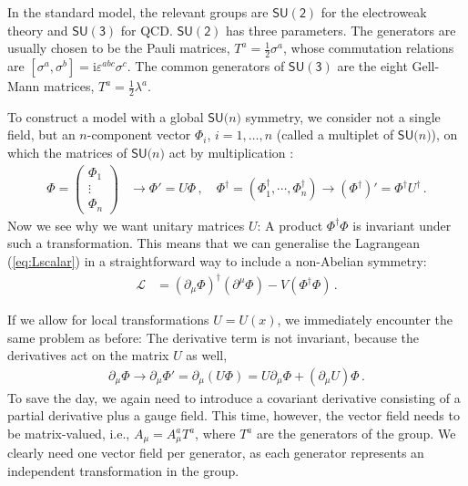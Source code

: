 \documentclass[12pt]{report}
\renewcommand{\L}{\ensuremath{\mathscr{L}}}
\newcommand{\sun}{\ensuremath{\mathsf{SU(}n\mathsf{)}}}
\newcommand{\sutwo}{\ensuremath{\mathsf{SU(2)}}}
\newcommand{\suthree}{\ensuremath{\mathsf{SU(3)}}}
\renewcommand{\i}{\ensuremath{\text{i}}}
\newcommand{\2}{\ensuremath{\sqrt{2}\,}}
\renewcommand{\L}{\ensuremath{\mathscr{L}}}
\begin{document}
{      In the standard model, the relevant groups are $\sutwo$ for the electroweak theory and
      $\suthree$ for QCD. $\sutwo$ has three parameters. The generators are usually
      chosen to be the Pauli matrices,
      $T^a=\frac{1}{2}\sigma^a$, whose commutation relations are 
      $\left[\sigma^a,\sigma^b\right]=\i \varepsilon^{abc}\sigma^c$. The common generators of
      $\suthree$ are the eight Gell-Mann matrices,
      $T^a=\frac{1}{2}\lambda^a$.
      
      To construct a model with a global $\sun$ symmetry, we consider not a single
      field, but an $n$-component vector $\Phi_i$, $i=1,\ldots,n$ (called a multiplet of $\sun$),
      on which the matrices of $\sun$ act by multiplication :
      \begin{align}
        \Phi=
        \begin{pmatrix}
          \Phi_1\\ \vdots \\\Phi_n
        \end{pmatrix}
        &\longrightarrow \Phi' = U \Phi\,, \quad 
        \Phi^\dagger=\left(\Phi_1^\dagger,\cdots,\Phi_n^\dagger\right) \longrightarrow
        \left(\Phi^\dagger\right)'=\Phi^\dagger U^\dagger \,.
      \end{align}
      Now we see why we want unitary matrices $U$: A product $\Phi^\dagger\Phi$ is
      invariant under such a transformation. This means that we can generalise the Lagrangean
      (\ref{eq:Lscalar}) in a straightforward way to include a non-Abelian symmetry:
      \begin{align}
        \L&= \left(\partial_\mu \Phi\right)^\dagger\!\left(\partial^\mu \Phi\right)
        -V\left(\Phi^\dagger\Phi\right) \,.
      \end{align}
      
      If we allow for local transformations $U=U(x)$, we immediately encounter the same problem as
      before: The derivative term is not invariant, because the derivatives act on the matrix $U$
      as well,
      \begin{align}
        \partial_\mu \Phi \to \partial_\mu\Phi' = \partial_\mu\left(U\Phi\right)=U\partial_\mu \Phi
        +\left(\partial_\mu U\right) \Phi\,.
      \end{align}
      To save the day, we again need to introduce a covariant derivative consisting of a partial
      derivative plus a gauge field.  This time, however, the
      vector field needs to be matrix-valued, i.e., $A_\mu = A_\mu^a T^a$, where $T^a$ are the
      generators of the group. We clearly need one vector field per
      generator, as each generator represents an independent transformation in the group. 
        
}
\end{document}
